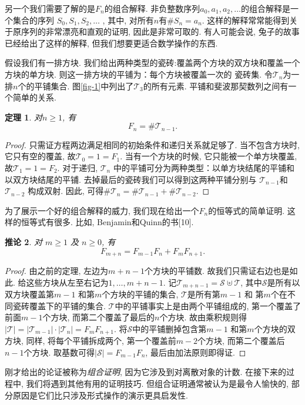 \documentclass{ctexbook}
\newtheorem{thm}{定理}[section]
\newtheorem{cor}[thm]{推论}
\begin{document}
另一个我们需要了解的是$F_{n}$的组合解释. 非负整数序列$a_{0}, a_{1}, a_{2}, \ldots$的组合解释是一个集合的序列
$S_{0}, S_{1}, S_{2}, \ldots$ , 其中, 对所有$n$有$\# S_{n}=a_{n}$. 这样的解释常常能得到关于原序列的非常漂亮和直观的证明,
因此是非常可取的. 有人可能会说, 兔子的故事已经给出了这样的解释, 但我们想要更适合数学操作的东西.

假设我们有一排方块. 我们给出两种类型的瓷砖:覆盖两个方块的双方块和覆盖一个方块的单方块. 则这一排方块的平铺为：每个方块被覆盖一次的
瓷砖集. 令$\mathcal{T}_{n}$为一排$n$个的平铺集合. 图\ref{fig-1}中列出了$\mathcal{T}_{3}$的所有元素. 平铺和斐波那契数列之间有一个简单的关系.
    \begin{thm}
   	      对$n \geqslant 1$,  有
   		  $$F_{n}=\# \mathcal{T}_{n-1}.$$
    \end{thm}
    \begin{proof}
    	 只需证方程两边满足相同的初始条件和递归关系就足够了. 当不包含方块时, 它只有空的覆盖, 故$\mathcal{T}_{0}=1=F_{1}$.
    	 当有一个方块的时候, 它只能被一个单方块覆盖, 故$\mathcal{T}_{1}=1=F_{2}$. 对于递归, $\mathcal{T}_{n}$
    	 中的平铺可分为两种类型：以单方块结尾的平铺和以双方块结尾的平铺. 去掉最后的瓷砖我们可以得到这两种平铺分别与
    	 $\mathcal{T}_{n-1}$和$\mathcal{T}_{n-2}$ 构成双射. 因此, 可得$\# \mathcal{T}_{n}=\# \mathcal{T}_{n-1}+\# \mathcal{T}_{n-2}$.
    \end{proof}
    为了展示一个好的组合解释的威力, 我们现在给出一个$F_{n}$的恒等式的简单证明. 这样的恒等式有很多. 比如, Benjamin和Quinn的书[10].
    \begin{cor}
    	对 $m \geqslant 1$ 及 $n \geqslant 0$, 有
    		$$F_{m+n}=F_{m-1} F_{n}+F_{m} F_{n+1}.$$
    \end{cor}
    \begin{proof}
    	由之前的定理, 左边为$m+n-1$个方块的平铺数. 故我们只需证右边也是如此. 给这些方块从左至右记为$1, \ldots, m+n-1$.
    	记$\mathcal{T}_{m+n-1}=\mathcal{S} \uplus \mathcal{T}$, 其中$\mathcal{S}$是所有以双方块覆盖第$m-1$ 和第$m$个方块的平铺的集合,
    	$\mathcal{T}$是所有第$m-1$ 和 第$m$个在不同瓷砖覆盖下的平铺的集合. $\mathcal{T}$中的平铺事实上是由两个平铺组成的,
    	第一个覆盖了前面$m-1$个方块, 而第二个覆盖了最后的$n$个方块. 故由乘积规则得$|\mathcal{T}|=\left|\mathcal{T}_{m-1}\right| \cdot\left|\mathcal{T}_{n}\right|=F_{m} F_{n+1} $.
    	将$\mathcal{S}$中的平铺删掉包含第$m-1$ 和第$m$个方块的双方块, 同样, 将每个平铺拆成两个, 第一个覆盖前$m-2$个方块, 而第二个覆盖后$n-1$个方块.
    	取基数可得$|\mathcal{S}|=F_{m-1} F_{n} $, 最后由加法原则即得证.
    \end{proof}
刚才给出的论证被称为\textsl{组合证明}, 因为它涉及到对离散对象的计数. 在接下来的过程中, 我们将遇到其他有用的证明技巧.
但组合证明通常被认为是最令人愉快的, 部分原因是它们比只涉及形式操作的演示更具启发性.
\end{document}
